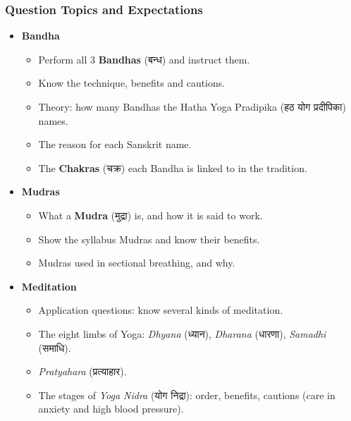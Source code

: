 \begin{frame}[fragile]\frametitle{Question Topics and Expectations}
    \begin{itemize}
        \item \textbf{Bandha}
        \begin{itemize}
            \item Perform all 3 \textbf{Bandhas} (बन्ध) and instruct them.
            \item Know the technique, benefits and cautions.
            \item Theory: how many Bandhas the Hatha Yoga Pradipika (हठ योग प्रदीपिका) names.
            \item The reason for each Sanskrit name.
            \item The \textbf{Chakras} (चक्र) each Bandha is linked to in the tradition.
        \end{itemize}

        \item \textbf{Mudras}
        \begin{itemize}
            \item What a \textbf{Mudra} (मुद्रा) is, and how it is said to work.
            \item Show the syllabus Mudras and know their benefits.
            \item Mudras used in sectional breathing, and why.
        \end{itemize}

        \item \textbf{Meditation}
        \begin{itemize}
            \item Application questions: know several kinds of meditation.
            \item The eight limbs of Yoga: \textit{Dhyana} (ध्यान), \textit{Dharana} (धारणा), \textit{Samadhi} (समाधि).
            \item \textit{Pratyahara} (प्रत्याहार).
            \item The stages of \textit{Yoga Nidra} (योग निद्रा): order, benefits, cautions (care in anxiety and high blood pressure).
        \end{itemize}
    \end{itemize}
\end{frame}


